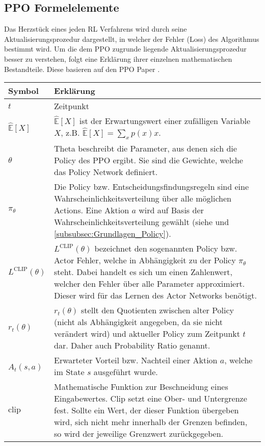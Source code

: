 \subsection{PPO Formelelemente}
Das Herzstück eines jeden RL Verfahrens wird durch seine Aktualisierungsprozedur dargestellt, in welcher der Fehler (Loss) des Algorithmus bestimmt wird. Um die dem PPO zugrunde liegende Aktualisierungsprozedur besser zu verstehen, folgt eine Erklärung ihrer einzelnen mathematischen Bestandteile. 
Diese basieren auf den PPO Paper \citep{PPO}.
\begin{longtable}[H]{|p{1.5cm}|p{\linewidth - 2.5cm}|}
	\hline
	Symbol & Erklärung \\
	\hline
	$t$ & Zeitpunkt \\
	\hline
	$\mathbb{\hat{E}}[X]$ & $\mathbb{\hat{E}}[X]$ ist der Erwartungswert einer zufälligen Variable $X$, z.B. $\mathbb{\hat{E}}[X] = \sum_{x}p(x)x$. \citep[Summary of Notation S. xv]{Sutton1998} \\
	\hline
	$\theta$ & Theta beschreibt die Parameter, aus denen sich die Policy des PPO ergibt. Sie sind die Gewichte, welche das Policy Network definiert. \\
	\hline
	$\pi_{\theta}$ & Die Policy bzw. Entscheidungsfindungsregeln sind eine Wahrscheinlichkeitsverteilung über alle möglichen Actions. Eine Aktion $a$ wird auf Basis der Wahrscheinlichkeitsverteilung gewählt (siehe \citep[Summary of Notation S. xvi]{Sutton1998} und \autoref{subsubsec:Grundlagen_Policy}). \\
	\hline
	$L^\text{CLIP} (\theta)$ & $L^\text{CLIP} (\theta)$ bezeichnet den sogenannten Policy bzw. Actor Fehler, welche in Abhängigkeit zu der Policy $\pi_{\theta}$ steht. Dabei handelt es sich um einen Zahlenwert, welcher den Fehler über alle Parameter approximiert. Dieser wird für das Lernen des Actor Networks benötigt. \\
	\hline
	$r_{t}(\theta)$ & $r_{t}(\theta)$ stellt den Quotienten zwischen alter Policy (nicht als Abhängigkeit angegeben, da sie nicht verändert wird) und aktueller Policy zum Zeitpunkt $t$ dar. Daher auch Probability Ratio genannt. \\
	\hline
	$\hat{A}_{t}(s, a)$ & Erwarteter Vorteil bzw. Nachteil einer Aktion $a$, welche im State $s$ ausgeführt wurde. \\
	\hline
	$\text{clip}$ & Mathematische Funktion zur Beschneidung eines Eingabewertes. Clip setzt eine Ober- und Untergrenze fest. Sollte ein Wert, der dieser Funktion übergeben wird, sich nicht mehr innerhalb der Grenzen befinden, so wird der jeweilige Grenzwert zurückgegeben. \\

\end{longtable}
